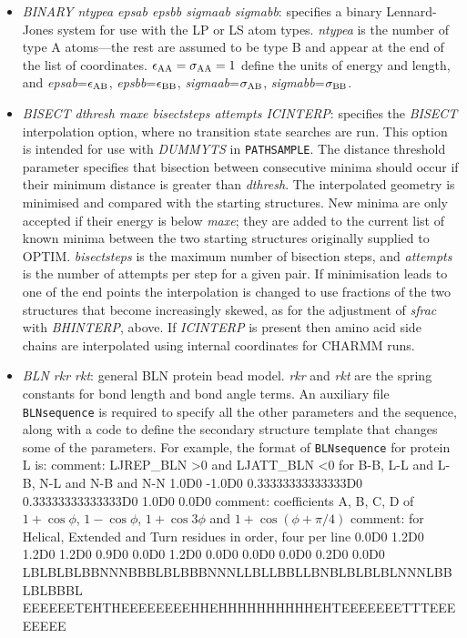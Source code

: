 \documentclass[12pt,a4paper,dvips]{article}
\begin{document}
\begin{itemize}
\item {\it BINARY ntypea epsab epsbb sigmaab sigmabb\/}: specifies a binary Lennard-Jones
system for use with the LP or LS atom types. {\it ntypea\/} is the number of type
A atoms---the rest are assumed to be type B and appear at the end of the list
of coordinates. $\epsilon_{\rm AA}=\sigma_{\rm AA}=1$ define the units of energy and length,
and {\it epsab\/}=$\epsilon_{\rm AB}$, {\it epsbb\/}=$\epsilon_{\rm BB}$,
{\it sigmaab\/}=$\sigma_{\rm AB}$, {\it sigmabb\/}=$\sigma_{\rm BB}$.

\item {\it BISECT dthresh maxe bisectsteps attempts ICINTERP\/}: specifies 
the {\it BISECT} interpolation option,
where no transition state searches are run. 
This option is intended for use with {\it DUMMYTS} in {\tt PATHSAMPLE}.
The distance threshold parameter specifies that bisection between consecutive minima
should occur if their minimum distance is greater than {\it dthresh}.
The interpolated geometry is minimised and compared with the starting structures.
New minima are only accepted if their energy is below {\it maxe}; they are added to the
current list of known minima between the two starting structures originally supplied to OPTIM. 
{\it bisectsteps\/} is the maximum number of bisection steps, and
{\it attempts} is the number of attempts per step for a given pair.
If minimisation leads to one of the end points the interpolation is changed to use
fractions of the two structures that become increasingly skewed, as for
the adjustment of {\it sfrac\/} with {\it BHINTERP\/}, above.
If {\it ICINTERP\/} is present then amino acid side chains are interpolated using
internal coordinates for CHARMM runs.

\item {\it BLN rkr rkt\/}: general BLN protein bead model.\cite{SorensonH00,BrownFH03}
{\it rkr} and {\it rkt} are the spring constants for bond length and bond angle terms.
An auxiliary file {\tt BLNsequence} is required to specify all the other parameters and
the sequence, along with a code to define the secondary structure template that changes
some of the parameters.
For example, the format of {\tt BLNsequence} for protein L is:
{\obeylines
comment: LJREP\_BLN >0  and LJATT\_BLN <0 for B-B, L-L and L-B, N-L and N-B and N-N
1.0D0 -1.0D0
0.33333333333333D0 0.33333333333333D0
1.0D0 0.0D0
comment: coefficients A, B, C, D of $1+\cos\phi$, $1-\cos\phi$, $1+\cos3\phi$ and $1+\cos(\phi +\pi/4)$
comment: for Helical, Extended and Turn residues in order, four per line
0.0D0 1.2D0 1.2D0 1.2D0
0.9D0 0.0D0 1.2D0 0.0D0
0.0D0 0.0D0 0.2D0 0.0D0
LBLBLBLBBNNNBBBLBLBBBNNNLLBLLBBLLBNBLBLBLBLNNNLBBLBLBBBL
EEEEEETEHTHEEEEEEEEHHEHHHHHHHHHHEHTEEEEEEETTTEEEEEEEE
}


\end{itemize}
\end{document}

